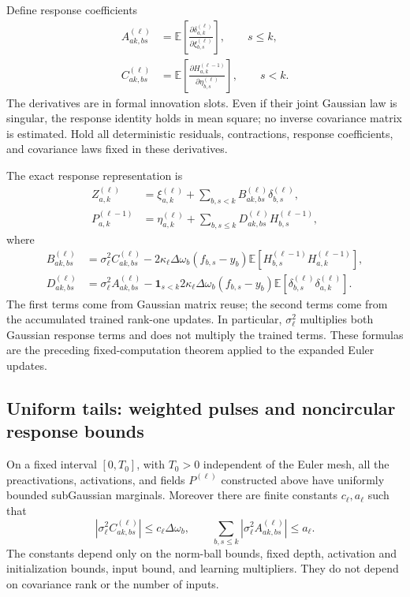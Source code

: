 Define response coefficients
\begin{align*}
 A_{ak,bs}^{(\ell)}
 &=\mathbb E\left[
   \frac{\partial\delta_{a,k}^{(\ell)}}
        {\partial\xi_{b,s}^{(\ell)}}\right],\qquad s\le k,\\
 C_{ak,bs}^{(\ell)}
 &=\mathbb E\left[
   \frac{\partial H_{a,k}^{(\ell-1)}}
        {\partial\eta_{b,s}^{(\ell)}}\right],\qquad s<k.
\end{align*}
The derivatives are in formal innovation slots.  Even if their joint
Gaussian law is singular, the response identity holds in mean square;
no inverse covariance matrix is estimated.  Hold all deterministic
residuals, contractions, response coefficients, and covariance laws fixed
in these derivatives.

The exact response representation is
\begin{align*}
 Z_{a,k}^{(\ell)}
 &=\xi_{a,k}^{(\ell)}+
       \sum_{b,s<k}B_{ak,bs}^{(\ell)}\delta_{b,s}^{(\ell)},\\
 P_{a,k}^{(\ell-1)}
 &=\eta_{a,k}^{(\ell)}+
       \sum_{b,s\le k}D_{ak,bs}^{(\ell)}H_{b,s}^{(\ell-1)},
\end{align*}
where
\begin{align*}
 B_{ak,bs}^{(\ell)}
 &=\sigma_\ell^2C_{ak,bs}^{(\ell)}
   -2\kappa_\ell\Delta\omega_b(f_{b,s}-y_b)
       \mathbb E[H_{b,s}^{(\ell-1)}H_{a,k}^{(\ell-1)}],\\
 D_{ak,bs}^{(\ell)}
 &=\sigma_\ell^2A_{ak,bs}^{(\ell)}
   -\mathbf{1}_{s<k}2\kappa_\ell\Delta\omega_b(f_{b,s}-y_b)
       \mathbb E[\delta_{b,s}^{(\ell)}\delta_{a,k}^{(\ell)}].
\end{align*}
The first terms come from Gaussian matrix reuse; the second terms come
from the accumulated trained rank-one updates.  In particular,
$\sigma_\ell^2$ multiplies both Gaussian response terms and does not
multiply the trained terms.  These formulas are the preceding
fixed-computation theorem applied to the expanded Euler updates.

\subsection{Uniform tails: weighted pulses and noncircular response bounds}
\label{app:response}

\begin{lemma}
\label{lem:app-response}
On a fixed interval $[0,T_0]$, with $T_0>0$ independent of the Euler
mesh, all the preactivations, activations, and fields $P^{(\ell)}$
constructed above have uniformly bounded subGaussian marginals.
Moreover there are finite constants $c_\ell,a_\ell$ such that
\[
 |\sigma_\ell^2C_{ak,bs}^{(\ell)}|
      \le c_\ell\Delta\omega_b,
 \qquad
 \sum_{b,s\le k}|\sigma_\ell^2A_{ak,bs}^{(\ell)}|
      \le a_\ell.
\]
The constants depend only on the norm-ball bounds, fixed depth,
activation and initialization bounds, input bound, and learning
multipliers.  They do not depend on covariance rank or the number of
inputs.
\end{lemma}

